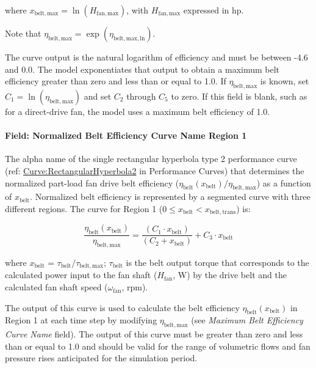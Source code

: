 where \(x_{\mathrm{belt,max}} = \ln(H_{\mathrm{fan,max}})\), with \(H_{\mathrm{fan,max}}\) expressed in hp.

Note that \(\eta_{\mathrm{belt,max}} = \exp(\eta_{\mathrm{belt,max,ln}})\).

The curve output is the natural logarithm of efficiency and must be between -4.6 and 0.0. The model exponentiates that output to obtain a maximum belt efficiency greater than zero and less than or equal to 1.0. If \(\eta_{\mathrm{belt,max}}\) is known, set \(C_1 = \ln(\eta_{\mathrm{belt,max}})\) and set \(C_2\) through \(C_5\) to zero. If this field is blank, such as for a direct-drive fan, the model uses a maximum belt efficiency of 1.0.

\paragraph{Field: Normalized Belt Efficiency Curve Name Region 1}\label{field-normalized-belt-efficiency-curve-name-region-1}

The alpha name of the single rectangular hyperbola type 2 performance curve (ref: \hyperref[curverectangularhyperbola2]{Curve:RectangularHyperbola2} in Performance Curves) that determines the normalized part-load fan drive belt efficiency (\(\eta_{\mathrm{belt}}(x_{\mathrm{belt}}) / \eta_{\mathrm{belt, max}}\)) as a function of \(x_{\mathrm{belt}}\). Normalized belt efficiency is represented by a segmented curve with three different regions. The curve for Region 1 (\(0 \le x_{\mathrm{belt}} < x_{\mathrm{belt, trans}}\)) is:

\begin{equation}
  \frac{\eta_{\mathrm{belt}} ( x_{\mathrm{belt}} )}{\eta_{\mathrm{belt, max}}} = \frac{(C_1 \cdot x_{\mathrm{belt}})}{(C_2 + x_{\mathrm{belt}})} + C_3 \cdot x_{\mathrm{belt}}
\end{equation}

where \(x_{\mathrm{belt}}\) = \(\tau_{\mathrm{belt}} / \tau_{\mathrm{belt, max}}\); \(\tau_{\mathrm{belt}}\) is the belt output torque that corresponds to the calculated power input to the fan shaft (\(H_{\mathrm{fan}}\), W) by the drive belt and the calculated fan shaft speed (\(\omega_{\mathrm{fan}}\), rpm).

The output of this curve is used to calculate the belt efficiency \(\eta_{\mathrm{belt}} (x_{\mathrm{belt}})\) in Region 1 at each time step by modifying \(\eta_{\mathrm{belt, max}}\) (see \emph{Maximum Belt Efficiency Curve Name} field). The output of this curve must be greater than zero and less than or equal to 1.0 and should be valid for the range of volumetric flows and fan pressure rises anticipated for the simulation period.


